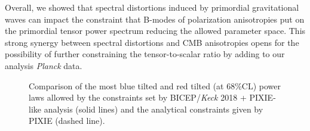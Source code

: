Overall, we showed that spectral distortions induced by primordial gravitational waves can impact the constraint that B-modes of polarization anisotropies put on the primordial tensor power spectrum reducing the allowed parameter space.
This strong synergy between spectral distortions and CMB anisotropies opens for the possibility of further constraining the tensor-to-scalar ratio by adding to our analysis \textit{Planck} data. 
\begin{figure}
    \centering
{}
\caption{Comparison of the most blue tilted and red tilted (at 68\%CL) power laws allowed  by the constraints set by BICEP/\emph{Keck} 2018 + PIXIE-like analysis (solid lines) and the analytical constraints given by PIXIE (dashed line).}
\label{fig:analy_const_BK18}
\end{figure}
